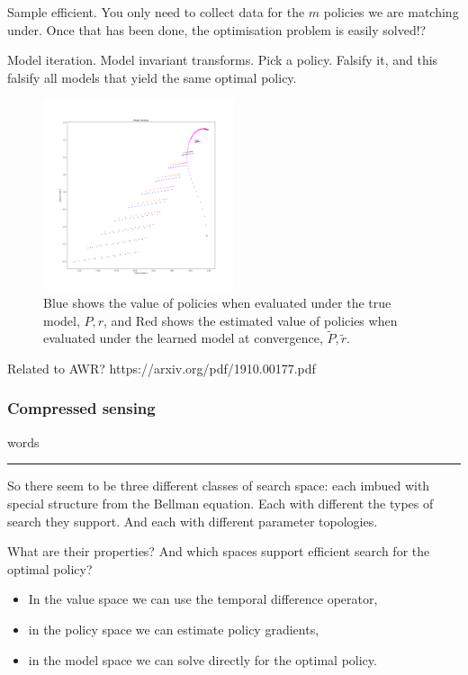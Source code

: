 Sample efficient. You only need to collect data for the $m$ policies we are matching under.
Once that has been done, the optimisation problem is easily solved!?

Model iteration. Model invariant transforms. Pick a policy. Falsify it,
and this falsify all models that yield the same optimal policy.

\begin{figure}
\centering
\includegraphics[width=0.5\textwidth,height=0.5\textheight]{../../pictures/figures/model_iteration.png}
\caption{Blue shows the value of policies when evaluated under the true model, $P, r$,
and Red shows the estimated value of policies when evaluated under the learned model at convergence, $\tilde P, \tilde r$.}
\end{figure}


Related to AWR? https://arxiv.org/pdf/1910.00177.pdf

\subsubsection{Compressed sensing}

words



\begin{center}\rule{0.5\linewidth}{\linethickness}\end{center}

So there seem to be three different classes of search space: each imbued with special
structure from the Bellman equation. Each with different the types of search they
support. And each with different parameter topologies.

What are their properties? And which spaces support efficient search for the optimal policy?

\begin{itemize}
\tightlist
\item
  In the value space we can use the temporal difference operator,
\item
  in the policy space we can estimate policy gradients,
\item
  in the model space we can solve directly for the optimal policy.
\end{itemize}

